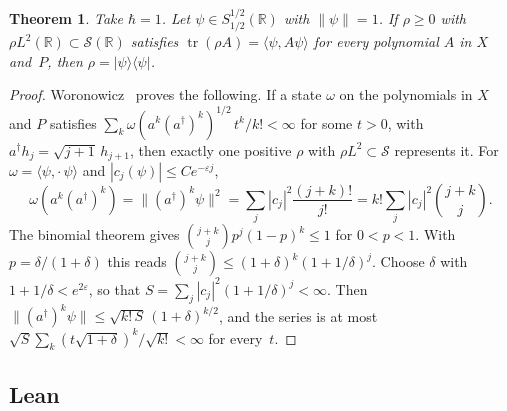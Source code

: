 \documentclass[11pt]{article}
\newtheorem{theorem}{Theorem}[section]
\theoremstyle{definition}
\begin{document}
\begin{theorem}\label{thm:gs-moments}
  Take $\hbar = 1$. Let $\psi \in S^{1/2}_{1/2}(\mathbb R)$ with $\|\psi\| = 1$. If $\rho \ge 0$ with
  $\rho L^2(\mathbb R) \subset \mathcal S(\mathbb R)$ satisfies
  $\operatorname{tr}(\rho A) = \langle\psi, A\psi\rangle$ for every polynomial $A$ in $X$
  and~$P$, then $\rho = |\psi\rangle\langle\psi|$.
\end{theorem}

\begin{proof}
  Woronowicz~\cite[Theorem]{woronowicz70} proves the following. If a state $\omega$ on the
  polynomials in $X$ and $P$ satisfies
  $\sum_k \omega(a^k(a^\dagger)^k)^{1/2}\,t^k/k! < \infty$ for some $t > 0$, with
  $a^\dagger h_j = \sqrt{j+1}\,h_{j+1}$, then exactly one positive $\rho$ with
  $\rho L^2 \subset \mathcal S$ represents it. For $\omega = \langle\psi, \cdot\,\psi\rangle$ and
  $|c_j(\psi)| \le Ce^{-\varepsilon j}$,
  \[
    \omega(a^k(a^\dagger)^k) = \|(a^\dagger)^k\psi\|^2 = \sum_j |c_j|^2\frac{(j+k)!}{j!}
    = k!\sum_j |c_j|^2\binom{j+k}{j}.
  \]
  The binomial theorem gives $\binom{j+k}{j}p^j(1-p)^k \le 1$ for $0 < p < 1$. With
  $p = \delta/(1+\delta)$ this reads $\binom{j+k}{j} \le (1+\delta)^k(1+1/\delta)^j$. Choose
  $\delta$ with $1 + 1/\delta < e^{2\varepsilon}$, so that
  $S = \sum_j |c_j|^2(1+1/\delta)^j < \infty$. Then
  $\|(a^\dagger)^k\psi\| \le \sqrt{k!\,S}\,(1+\delta)^{k/2}$, and the series is at most
  $\sqrt S\sum_k (t\sqrt{1+\delta})^k/\sqrt{k!} < \infty$ for every~$t$.
\end{proof}

\subsection{Lean}
\end{document}
